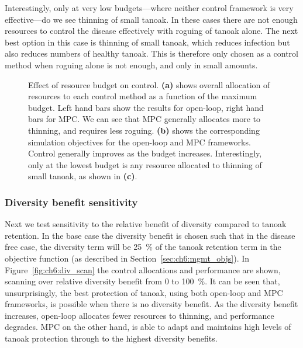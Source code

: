 Interestingly, only at very low budgets---where neither control framework is very effective---do we see thinning of small tanoak. In these cases there are not enough resources to control the disease effectively with roguing of tanoak alone. The next best option in this case is thinning of small tanoak, which reduces infection but also reduces numbers of healthy tanoak. This is therefore only chosen as a control method when roguing alone is not enough, and only in small amounts.

\begin{figure}[H]
    \begin{center}
        \caption[Varying the control budget]{Effect of resource budget on control. \textbf{(a)} shows overall allocation of resources to each control method as a function of the maximum budget. Left hand bars show the results for open-loop, right hand bars for MPC\@. We can see that MPC generally allocates more to thinning, and requires less roguing. \textbf{(b)} shows the corresponding simulation objectives for the open-loop and MPC frameworks. Control generally improves as the budget increases. Interestingly, only at the lowest budget is any resource allocated to thinning of small tanoak, as shown in \textbf{(c)}.\label{fig:ch6:budget_scan}}
    \end{center}
\end{figure}

\subsubsection{Diversity benefit sensitivity}\label{sec:ch6:div_scan}

Next we test sensitivity to the relative benefit of diversity compared to tanoak retention. In the base case the diversity benefit is chosen such that in the disease free case, the diversity term will be \SI{25}{\percent} of the tanoak retention term in the objective function (as described in Section~\ref{sec:ch6:mgmt_objs}). In Figure~\ref{fig:ch6:div_scan} the control allocations and performance are shown, scanning over relative diversity benefit from 0 to \SI{100}{\percent}. It can be seen that, unsurprisingly, the best protection of tanoak, using both open-loop and MPC frameworks, is possible when there is no diversity benefit. As the diversity benefit increases, open-loop allocates fewer resources to thinning, and performance degrades. MPC on the other hand, is able to adapt and maintains high levels of tanoak protection through to the highest diversity benefits.

